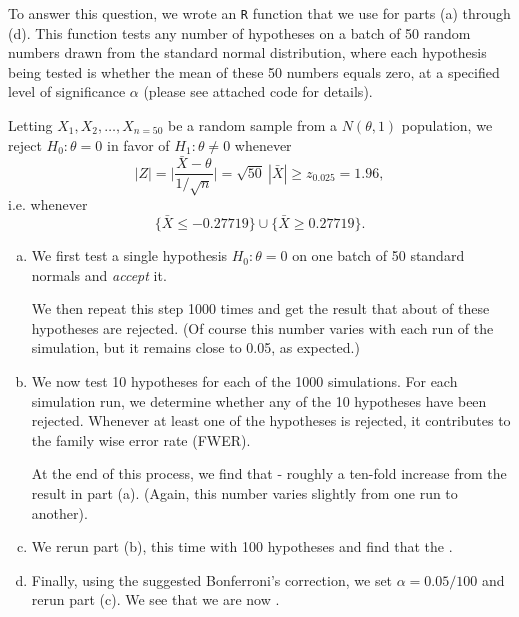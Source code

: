 \documentclass[12pt]{article}
\begin{document}
   To answer this question,  we wrote an \texttt{R} function that we use for parts (a) through (d). This function tests any number of hypotheses on a batch of 50 random numbers drawn from the standard normal distribution, where each hypothesis being tested is whether the mean of these 50 numbers equals zero, at a specified level of significance $\alpha$ (please see attached code for details). 
   
  Letting ${X_1, X_2, \dots, X_{n =50}}$ be a random sample from a $N(\theta, 1)$ population,
we reject $H_0 : \theta = 0$ in favor of $H_1 : \theta \neq 0$ whenever 
 $$
 | Z | = \Big| \frac{\bar X - \theta}{ 1 / \sqrt n} \Big| = \sqrt {50}\  | \bar X | \geq z_{0.025} = 1.96, 
 $$
 i.e. whenever
 $$
 \{ \bar X  \leq - 0.27719 \} \cup \{ \bar X \geq 0.27719 \} .
 $$


\begin{enumerate}[(a)]  
\item We first test a single hypothesis $H_0 : \theta = 0$ on one batch of 50 standard normals and \emph{accept} it. 

We then repeat this step 1000 times and get the result that about  of these hypotheses are rejected. (Of course this number varies with each run of the simulation, but it remains close to 0.05, as expected.)

\item We now test 10 hypotheses for each of the 1000 simulations. For each simulation run, we determine whether any of the 10 hypotheses have been rejected. Whenever at least one of the hypotheses is rejected, it contributes to the family wise error rate (FWER). 

At the end of this process, we find that  - roughly a ten-fold increase from the result in part (a). (Again, this number varies slightly from one run to another).
\item We rerun part (b), this time with 100 hypotheses and find that the .
\item Finally, using the suggested Bonferroni's correction, we set $\alpha = 0.05/100$ and rerun part (c). We see that we are now .

\end{enumerate}
\end{document}
